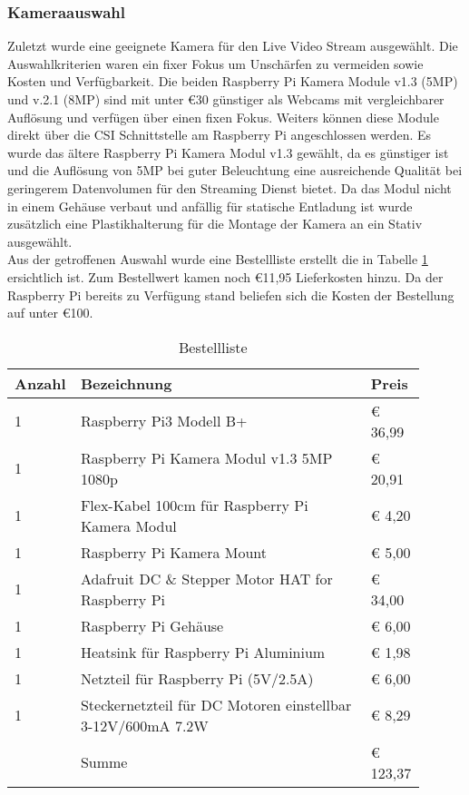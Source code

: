 \documentclass[BMR,Bachelor,ngerman]{twbook}%
\begin{document}
\subsubsection{Kameraauswahl}
Zuletzt wurde eine geeignete Kamera für den Live Video Stream ausgewählt. Die Auswahlkriterien waren ein fixer Fokus um Unschärfen zu vermeiden sowie Kosten und Verfügbarkeit. Die beiden Raspberry Pi Kamera Module v1.3 (5MP) und v.2.1 (8MP) sind mit unter \euro{30} günstiger als Webcams mit vergleichbarer Auflösung und verfügen über einen fixen Fokus. Weiters können diese Module direkt über die \ac{CSI} Schnittstelle am Raspberry Pi angeschlossen werden. Es wurde das ältere Raspberry Pi Kamera Modul v1.3 gewählt, da es günstiger ist und die Auflösung von 5MP bei guter Beleuchtung eine ausreichende Qualität bei geringerem Datenvolumen für den Streaming Dienst bietet. Da das Modul nicht in einem Gehäuse verbaut und anfällig für statische Entladung ist wurde zusätzlich eine Plastikhalterung für die Montage der Kamera an ein Stativ ausgewählt.
\\\newline
Aus der getroffenen Auswahl wurde eine Bestellliste erstellt die in Tabelle \ref{tab:order} ersichtlich ist. Zum Bestellwert kamen noch \euro{11,95} Lieferkosten hinzu. Da der Raspberry Pi bereits zu Verfügung stand beliefen sich die Kosten der Bestellung auf unter \euro{100}.
\begin{table}[H]
\centering
\caption{Bestellliste}
\label{tab:order}
\begin{tabular}{| p{0.1\linewidth} | p{0.7\linewidth} | p{0.1\linewidth} |}\hline
\rowcolor[gray]{0.8} Anzahl & Bezeichnung & Preis\\\hline
	1 & Raspberry Pi3 Modell B+ & \euro{ 36,99}\\\hline
	1 & Raspberry Pi Kamera Modul v1.3 5MP 1080p & \euro{ 20,91}\\\hline
	1 & Flex-Kabel 100cm für Raspberry Pi Kamera Modul & \euro{ 4,20}\\\hline
	1 & Raspberry Pi Kamera Mount & \euro{ 5,00}\\\hline
	1 & Adafruit DC \& Stepper Motor HAT for Raspberry Pi & \euro{ 34,00}\\\hline
	1 & Raspberry Pi Gehäuse & \euro{ 6,00}\\\hline
	1 & Heatsink für Raspberry Pi Aluminium & \euro{ 1,98}\\\hline
	1 & Netzteil für Raspberry Pi (5V/2.5A) &\euro{ 6,00}\\\hline
	1 & Steckernetzteil für DC Motoren einstellbar 3-12V/600mA 7.2W & \euro{ 8,29}\\\hline
	& Summe& \cellcolor[gray]{0.9}\euro{ 123,37}\\\hline
\end{tabular}
\end{table}
%
\end{document}
